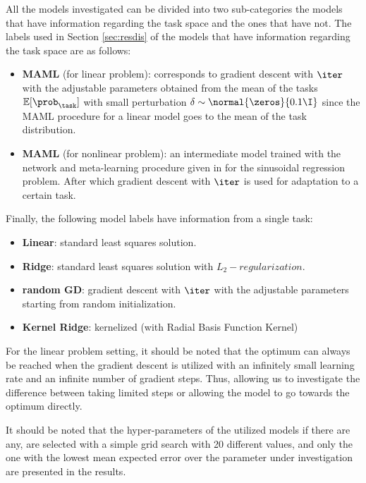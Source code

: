 All the models investigated can be divided into two sub-categories the models that have information regarding the task space and the ones that have not. The labels  used in Section \ref{sec:resdis} of the models that have information regarding the task space are as follows:
\begin{itemize}
  \item \textbf{MAML} (for linear problem): corresponds to gradient descent with $\iter$ with the adjustable parameters obtained from the mean of the tasks $\mathbb{E}[\prob_{\task}]$ with small perturbation $\delta\sim\normal{\zeros}{0.1\I}$ since the MAML procedure for a linear model goes to the mean of the task distribution. 
  \item \textbf{MAML} (for nonlinear problem): an intermediate model trained with the network and meta-learning procedure given in \cite{finn2017} for the sinusoidal regression problem. After which gradient descent with $\iter$ is used for adaptation to a certain task.
\end{itemize} 

Finally, the following model labels have information from a single task:
\begin{itemize}
  \item \textbf{Linear}: standard least squares solution.
  \item \textbf{Ridge}: standard least squares solution with $L_2-regularization$.
  \item \textbf{random GD}: gradient descent with $\iter$ with the adjustable parameters starting from random initialization.
  \item \textbf{Kernel Ridge}: kernelized (with Radial Basis Function Kernel) 
\end{itemize}

For the linear problem setting, it should be noted that the optimum can always be reached when the gradient descent is utilized with an infinitely small learning rate and an infinite number of gradient steps. Thus, allowing us to investigate the difference between taking limited steps or allowing the model to go towards the optimum directly.

It should be noted that the hyper-parameters of the utilized models if there are any, are selected with a simple grid search with 20 different values, and only the one with the lowest mean expected error over the parameter under investigation are presented in the results. 
